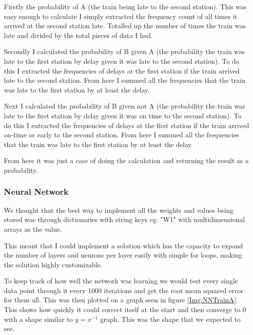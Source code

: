 \documentclass[11pt]{article}
\begin{document}
	Firstly the probability of A (the train being late to the second station). This was easy enough to calculate I simply extracted the frequency count of all times it arrived at the second station late. Totalled up the number of times the train was late and divided by the total pieces of data I had.
	
	Secondly I calculated the probability of B given A (the probability the train was late to the first station by delay given it was late to the second station). To do this I extracted the frequencies of delays at the first station if the train arrived late to the second station. From here I summed all the frequencies that the train was late to the first station by at least the delay.
	
	Next I calculated the probability of B given not A (the probability the train was late to the first station by delay given it was on time to the second station). To do this I extracted the frequencies of delays at the first station if the train arrived on-time or early to the second station. From here I summed all the frequencies that the train was late to the first station by at least the delay.	
	
	From here it was just a case of doing the calculation and returning the result as a probability.
	
	\subsubsection{Neural Network}
	
	 We thought that the best way to implement all the weights and values being stored was through dictionaries with string keys eg: "W1" with multidimensional arrays as the value. 
	 
	 This meant that I could implement a solution which has the capacity to expand the number of layers and neurons per layer easily with simple for loops, making the solution highly customizable.
	 
	 To keep track of how well the network was learning we would test every single data point through it every 1000 iterations and get the root mean squared error for them all. This was then plotted on a graph seen in figure \ref{Img:NNTrainA}. This shows how quickly it could correct itself at the start and then converge to 0 with a shape similar to $y=x^{-1}$ graph. This was the shape that we expected to see.
	 
\end{document}
